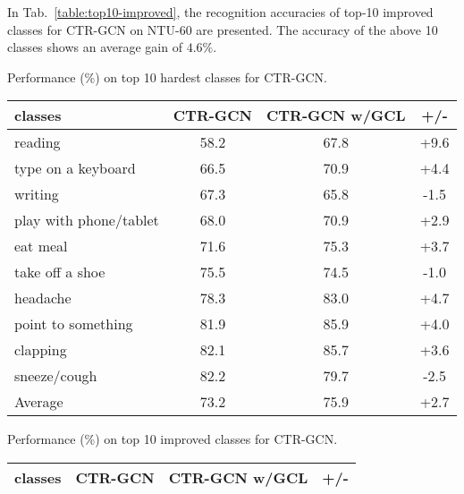 \documentclass{article} \usepackage{iclr2023_conference,times}
\begin{document}
In Tab.~\ref{table:top10-improved}, the recognition accuracies of top-10 improved classes for CTR-GCN on NTU-60 are presented. The accuracy of the above 10 classes shows an average gain of $4.6\%$.

\begin{minipage}{\textwidth}
\begin{minipage}[t]{0.5\textwidth}
\centering
\makeatletter{}
\setlength\tabcolsep{2.5pt}
   \scriptsize
   \caption{Performance (\%) on top 10 hardest classes for CTR-GCN.}
    \begin{tabular}{l||c|c|c}
    \rowcolor{gray!30} classes & CTR-GCN & CTR-GCN w/GCL & +/- \\ \hline \hline
    reading                & 58.2    & 67.8          & +9.6      \\ \hline
    type on a keyboard     & 66.5    & 70.9          & +4.4      \\ \hline
    writing                & 67.3    & 65.8          & -1.5     \\ \hline
    play with phone/tablet & 68.0    & 70.9          & +2.9      \\ \hline
    eat meal               & 71.6    & 75.3          & +3.7      \\ \hline
    take off a shoe        & 75.5    & 74.5          & -1.0     \\ \hline
    headache               & 78.3    & 83.0          & +4.7      \\ \hline
    point to something     & 81.9    & 85.9          & +4.0      \\ \hline
    clapping               & 82.1    & 85.7          & +3.6      \\ \hline
    sneeze/cough           & 82.2    & 79.7          & -2.5     \\ \hline \hline
    Average                & 73.2    & 75.9          & +2.7     \\ \hline
    \end{tabular}
\label{table:table:top10-hardest}
\end{minipage}
\hspace{3mm}
\begin{minipage}[t]{0.5\textwidth}
\centering
\makeatletter{}
\setlength\tabcolsep{2.5pt}
   \scriptsize
   \caption{Performance (\%) on top 10 improved classes for CTR-GCN.}
    \begin{tabular}{l||c|c|c}
    \rowcolor{gray!30} classes & CTR-GCN & CTR-GCN w/GCL & +/-      \\ \hline \hline

\end{tabular}
\end{minipage}
\end{minipage}
\end{document}
